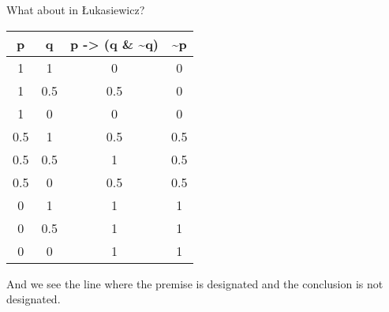 \documentclass[
]{article}
\begin{document}
What about in Łukasiewicz?

\begin{longtable}[]{@{}cccc@{}}
\toprule()
p & q & p -\textgreater{} (q \& \textasciitilde q) &
\textasciitilde p \\
\midrule()
\endhead
1 & 1 & 0 & 0 \\
1 & 0.5 & 0.5 & 0 \\
1 & 0 & 0 & 0 \\
0.5 & 1 & 0.5 & 0.5 \\
0.5 & 0.5 & 1 & 0.5 \\
0.5 & 0 & 0.5 & 0.5 \\
0 & 1 & 1 & 1 \\
0 & 0.5 & 1 & 1 \\
0 & 0 & 1 & 1 \\
\bottomrule()
\end{longtable}

And we see the line where the premise is designated and the conclusion
is not designated.
\end{document}
